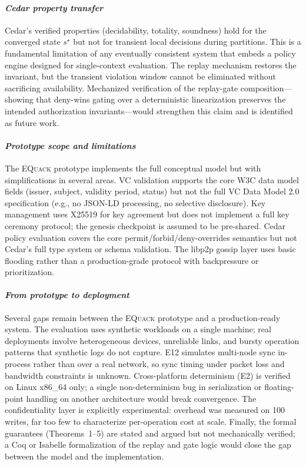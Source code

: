 \documentclass[10pt,journal,compsoc]{IEEEtran}
\newcommand{\equack}{\textsc{EQuack}}
\begin{document}
\paragraph*{\textit{Cedar property transfer}}
Cedar's verified properties (decidability, totality, soundness) hold for the converged state $s^\star$ but not for transient local decisions during partitions. This is a fundamental limitation of any eventually consistent system that embeds a policy engine designed for single-context evaluation. The replay mechanism restores the invariant, but the transient violation window cannot be eliminated without sacrificing availability. Mechanized verification of the replay-gate composition---showing that deny-wins gating over a deterministic linearization preserves the intended authorization invariants---would strengthen this claim and is identified as future work.

\paragraph*{\textit{Prototype scope and limitations}}
The \equack{} prototype implements the full conceptual model but with simplifications in several areas. VC validation supports the core W3C data model fields (issuer, subject, validity period, status) but not the full VC Data Model 2.0 specification (e.g., no JSON-LD processing, no selective disclosure). Key management uses X25519 for key agreement but does not implement a full key ceremony protocol; the genesis checkpoint is assumed to be pre-shared. Cedar policy evaluation covers the core permit/forbid/deny-overrides semantics but not Cedar's full type system or schema validation. The libp2p gossip layer uses basic flooding rather than a production-grade protocol with backpressure or prioritization.

\paragraph*{\textit{From prototype to deployment}}
Several gaps remain between the \equack{} prototype and a production-ready system. The evaluation uses synthetic workloads on a single machine; real deployments involve heterogeneous devices, unreliable links, and bursty operation patterns that synthetic logs do not capture. E12 simulates multi-node sync in-process rather than over a real network, so sync timing under packet loss and bandwidth constraints is unknown. Cross-platform determinism (E2) is verified on Linux x86\_64 only; a single non-determinism bug in serialization or floating-point handling on another architecture would break convergence. The confidentiality layer is explicitly experimental: overhead was measured on 100 writes, far too few to characterize per-operation cost at scale. Finally, the formal guarantees (Theorems~1--5) are stated and argued but not mechanically verified; a Coq or Isabelle formalization of the replay and gate logic would close the gap between the model and the implementation.
\end{document}
